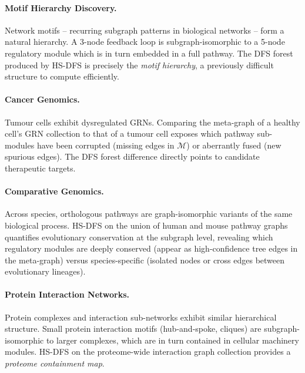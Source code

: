 ﻿\documentclass[12pt,a4paper]{article}
\theoremstyle{plain}
\theoremstyle{definition}
\theoremstyle{remark}
\begin{document}
	\paragraph{Motif Hierarchy Discovery.}
	Network motifs -- recurring subgraph patterns in biological networks -- form
	a natural hierarchy.  A 3-node feedback loop is subgraph-isomorphic to a
	5-node regulatory module which is in turn embedded in a full pathway.  The
	DFS forest produced by HS-DFS is precisely the \emph{motif hierarchy}, a
	previously difficult structure to compute efficiently.
	
	\paragraph{Cancer Genomics.}
	Tumour cells exhibit dysregulated GRNs.  Comparing the meta-graph of a
	healthy cell's GRN collection to that of a tumour cell exposes which pathway
	sub-modules have been corrupted (missing edges in $\mathcal{M}$) or
	aberrantly fused (new spurious edges).  The DFS forest difference directly
	points to candidate therapeutic targets.
	
	\paragraph{Comparative Genomics.}
	Across species, orthologous pathways are graph-isomorphic variants of the
	same biological process.  HS-DFS on the union of human and mouse pathway
	graphs quantifies evolutionary conservation at the subgraph level, revealing
	which regulatory modules are deeply conserved (appear as high-confidence
	tree edges in the meta-graph) versus species-specific (isolated nodes or
	cross edges between evolutionary lineages).
	
	\paragraph{Protein Interaction Networks.}
	Protein complexes and interaction sub-networks exhibit similar hierarchical
	structure.  Small protein interaction motifs (hub-and-spoke, cliques) are
	subgraph-isomorphic to larger complexes, which are in turn contained in
	cellular machinery modules.  HS-DFS on the proteome-wide interaction graph
	collection provides a \emph{proteome containment map}.
	
\end{document}
